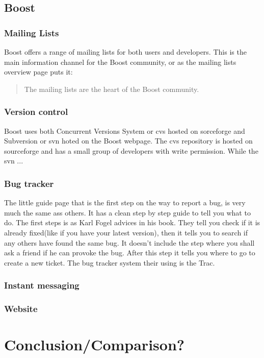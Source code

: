 \documentclass{report} %
\begin{document}
\subsection{Boost}
\subsubsection{Mailing Lists}
Boost offers a range of mailing lists\cite{boostmaillists} for both users and developers. This is the main information channel for the Boost community, or as the mailing lists overview page\cite{boostmaillists} puts it:
\begin{quote}
The mailing lists are the heart of the Boost community.
\end{quote}

\subsubsection{Version control}
Boost uses both Concurrent Versions System or cvs hosted on sorceforge\cite{boostcvssourceforge} and Subversion or svn hoted on the Boost webpage\cite{boostsvn}. The cvs repository is hosted on sourceforge and has a small group of developers with write permission. While the svn ...

\subsubsection{Bug tracker}
The little guide page that is the first step on the way to report a bug, is very much the same ass others. It has a clean step by step guide to tell you what to do. The first steps is as Karl Fogel advices in his book\cite{kfposs}. They tell you check if it is already fixed(like if you have your latest version), then it tells you to search if any others have found the same bug. It doesn't include the step where you shall ask a friend if he can provoke the bug. After this step it tells you where to go to create a new ticket. The bug tracker system their using is the Trac. 

\subsubsection{Instant messaging}
\subsubsection{Website}

\section{Conclusion/Comparison?}


\end{document}
